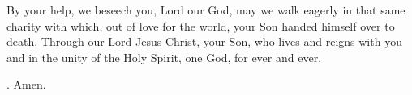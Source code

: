 \lettrine[lines=3]{B}{}y your help, we beseech you, Lord our God, 
may we walk eagerly in that same charity with which,
out of love for the world,
your Son handed himself over to death.
Through our Lord Jesus Christ, your Son,
who lives and reigns with you and in the unity of the Holy Spirit,
one God, for ever and ever.
\par \Rbar. Amen.

